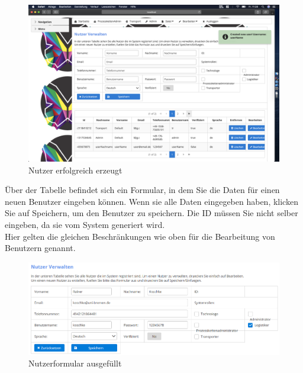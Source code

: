 \documentclass[enabledeprecatedfontcommands,fontsize=12pt,paper=a4,twoside]{scrartcl}
\begin{document}
\begin{figure}[h!]
\begin{center}
 \includegraphics[width=\textwidth]{screenshots/admin/userErzeugenMeldung.png}
  \caption{Nutzer erfolgreich erzeugt}
  \label{fig:boat2}
\end{center}
\end{figure}

Über der Tabelle befindet sich ein Formular, in dem Sie die Daten für einen neuen Benutzer eingeben können. Wenn sie alle Daten eingegeben haben, klicken Sie auf Speichern, um den Benutzer zu speichern. Die ID müssen Sie nicht selber eingeben, da sie vom System generiert wird. \\
Hier gelten die gleichen Beschränkungen wie oben für die Bearbeitung von Benutzern genannt. \\

\begin{figure}[h!]
\begin{center}
 \includegraphics[width=\textwidth]{screenshots/admin/nutzerformularausgefuellt.png}
  \caption{Nutzerformular ausgefüllt}
  \label{fig:boat3}
\end{center}
\end{figure}
\end{document}
